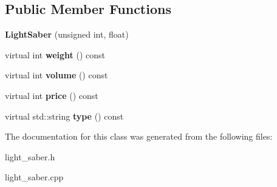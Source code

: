\subsection*{Public Member Functions}
\begin{DoxyCompactItemize}
\item 
\hypertarget{classda__game_1_1LightSaber_a4008857749873e2a2cd3bc8258e05741}{
{\bfseries LightSaber} (unsigned int, float)}
\label{classda__game_1_1LightSaber_a4008857749873e2a2cd3bc8258e05741}

\item 
\hypertarget{classda__game_1_1LightSaber_aa4ca392fb17a006df70176045e36ba4d}{
virtual int {\bfseries weight} () const }
\label{classda__game_1_1LightSaber_aa4ca392fb17a006df70176045e36ba4d}

\item 
\hypertarget{classda__game_1_1LightSaber_ab2883eb294fb19ac5bbb9c5215f1cfd5}{
virtual int {\bfseries volume} () const }
\label{classda__game_1_1LightSaber_ab2883eb294fb19ac5bbb9c5215f1cfd5}

\item 
\hypertarget{classda__game_1_1LightSaber_a2ddf499cbf92bb6456beac3b4b6bcd64}{
virtual int {\bfseries price} () const }
\label{classda__game_1_1LightSaber_a2ddf499cbf92bb6456beac3b4b6bcd64}

\item 
\hypertarget{classda__game_1_1LightSaber_ac69f6a976779c9c16d48ee7637a4a8db}{
virtual std::string {\bfseries type} () const }
\label{classda__game_1_1LightSaber_ac69f6a976779c9c16d48ee7637a4a8db}

\end{DoxyCompactItemize}


The documentation for this class was generated from the following files:\begin{DoxyCompactItemize}
\item 
light\_\-saber.h\item 
light\_\-saber.cpp\end{DoxyCompactItemize}
